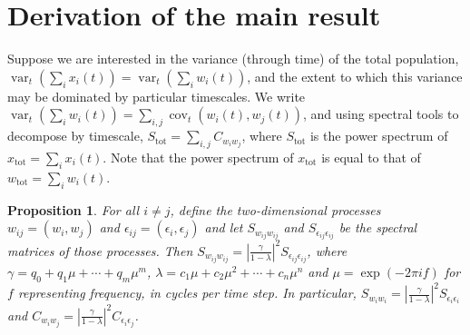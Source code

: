 \documentclass[letterpaper,11pt]{article}
\newcommand{\var}{{\operatorname{var}}}
\newcommand{\cov}{{\operatorname{cov}}}
\newtheorem{proposition}[theorem]{Proposition}
\begin{document}
\section{Derivation of the main result}

Suppose we are interested in the variance (through time) of the
total population, $\var_t(\sum_i x_i(t)) = \var_t(\sum_i w_i(t))$,
and the extent to which this variance may be dominated by particular timescales.
We write $\var_t(\sum_i w_i(t))=\sum_{i,j} \cov_t(w_i(t),w_j(t))$,
and using spectral tools to decompose by timescale,
$S_{\text{tot}} = \sum_{i,j} C_{w_i w_j}$, where $S_{\text{tot}}$
is the power spectrum of $x_{\text{tot}} = \sum_i x_i(t)$. Note that
the power spectrum of $x_{\text{tot}}$ is equal to that of 
$w_{\text{tot}}=\sum_i w_i(t)$. 

\begin{proposition}
For all $i \neq j$, define the two-dimensional processes 
$w_{ij}=(w_i,w_j)$ and $\epsilon_{ij} = (\epsilon_{i},\epsilon_{j})$ and 
let $S_{w_{ij} w_{ij}}$ and $S_{\epsilon_{ij}\epsilon_{ij}}$ be the spectral
matrices of those processes. Then
$S_{w_{ij} w_{ij}} = \left| \frac{\gamma}{1-\lambda} \right|^2 S_{\epsilon_{ij}\epsilon_{ij}}$, where $\gamma=q_{ 0}+q_{ 1}\mu+\cdots+q_{m}\mu^{m}$,
$\lambda=c_{ 1 }\mu+c_{ 2}\mu^{2}+\cdots+c_{n}\mu^{n}$ and $\mu=\exp(-2\pi i f)$
for $f$ representing frequency, in cycles per time step. In particular,
$S_{w_i w_i} = \left| \frac{\gamma}{1-\lambda} \right|^2 S_{\epsilon_{i}\epsilon_{i}}$ 
and $C_{w_i w_j} = \left| \frac{\gamma}{1-\lambda} \right|^2 C_{\epsilon_{i}\epsilon_{j}}$.
\label{prop:mainprop}
\end{proposition}
\end{document}
